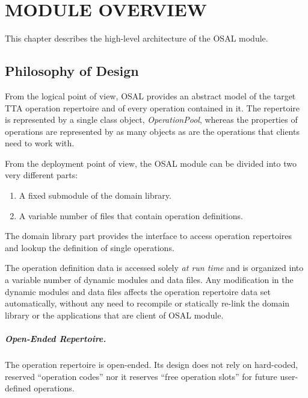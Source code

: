 \documentclass[a4paper,twoside]{tce}
\begin{document}
\chapter{MODULE OVERVIEW}

This chapter describes the high-level architecture of the OSAL module.

\section{Philosophy of Design}



From the logical point of view, OSAL provides an abstract model of the
target TTA operation repertoire and of every operation contained in it.  The
repertoire is represented by a single class object, \emph{OperationPool},
whereas the properties of operations are represented by as many objects as
are the operations that clients need to work with.

From the deployment point of view, the OSAL module can be divided into two
very different parts:
\begin{enumerate}
\item %
  A fixed submodule of the domain library.
\item %
  A variable number of files that contain operation definitions.
\end{enumerate}

The domain library part provides the interface to access operation
repertoires and lookup the definition of single operations.

The operation definition data is accessed solely \emph{at run time} and is
organized into a variable number of dynamic modules and data files.  
Any modification in the dynamic modules and data files affects
the operation repertoire data set automatically, without any need to
recompile or statically re-link the domain library or the applications that
are client of OSAL module.

\paragraph{Open-Ended Repertoire.}
The operation repertoire is open-ended. Its design does not rely on
hard-coded, reserved ``operation codes'' nor it reserves ``free operation
slots'' for future user-defined operations.
\end{document}
